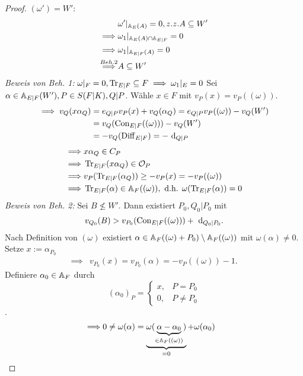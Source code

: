 \begin{proof}
    $(\omega')=W'$: 
    \begin{align*}
        & \omega'|_{\mathbb{A}_E(A)}=0, z.z. A \subseteq W'\\
        \implies & \omega_1|_{\mathbb{A}_E(A) \cap \mathbb{A}_{E|F}} = 0\\
        \implies & \omega_1|_{\mathbb{A}_{E|F}(A)} = 0\\
        \stackrel{Beh. 2}{\implies} & A \subseteq W'
    \end{align*}
    \textit{Beweis von Beh. 1:} $\omega|_F=0, \operatorname{Tr}_{E|F} \subseteq F \implies \omega_1|_E = 0$
    Sei $\alpha \in \mathbb{A}_{E|F}(W'), P \in S(F|K), Q|P$. Wähle $x \in F$ mit $v_P(x) = v_P((\omega))$.
    \begin{align*}
        \implies v_Q(x\alpha_Q) & = e_{Q|P}v_P(x) + v_Q(\alpha_Q) = e_{Q|P}v_P((\omega)) - v_Q(W')\\
        & = v_Q(\operatorname{Con}_{E|F}((\omega))) - v_Q(W')\\
        & = -v_Q(\operatorname{Diff}_{E|F}) = - \text{ d}_{Q|P}\\
    \end{align*}
    \begin{align*}
        \implies & x\alpha_Q \in C_P\\
        \implies & \operatorname{Tr}_{E|F}(x\alpha_Q) \in \mathcal{O}_P\\
        \implies & v_P(\operatorname{Tr}_{E|F}(\alpha_Q)) \geq -v_P(x) = -v_P((\omega))\\
        \implies & \operatorname{Tr}_{E|F}(\alpha) \in \mathbb{A}_F((\omega)), \text{ d.h. } \omega(\operatorname{Tr}_{E|F}(\alpha)) = 0
    \end{align*}
    \textit{Beweis von Beh. 2:} Sei $B \not \leq W'$. Dann existiert $P_0, Q_0|P_0$ mit
    $$ v_{Q_0}(B) > v_{P_0}(\operatorname{Con}_{E|F}((\omega))) + \text{ d}_{Q_0|P_0}. $$
    Nach Definition von $(\omega)$ existiert $\alpha \in \mathbb{A}_F((\omega) + P_0)\setminus\mathbb{A}_F((\omega))$ mit
    $\omega(\alpha)\ne 0$.
    Setze $x:= \alpha_{P_0}$
    \begin{align*}
        \implies & v_{P_0}(x) = v_{P_0}(\alpha) = -v_P((\omega)) - 1.
    \end{align*}
    Definiere $\alpha_0 \in \mathbb{A}_F$ durch 
    $$(\alpha_0)_P = \begin{cases}
        x, & P=P_0\\
        0, & P \ne P_0
    \end{cases}$$.
    \begin{align*}
        \implies & 0 \ne \omega(\alpha) = \underbrace{\omega(\underbrace{\alpha-\alpha_0}_{\in \mathbb{A}_F((\omega))})}_{=0}+\omega(\alpha_0)
    \end{align*}

\end{proof}
